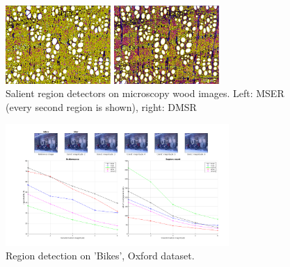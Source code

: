 \documentclass{article}
\begin{document}
\begin{figure}[htb]

\begin{minipage}[b]{.49\linewidth}
  \centering
  \centerline{\includegraphics[width=4.0cm]{./Figs/mserWood}}
\end{minipage}
\hfill
\begin{minipage}[b]{0.49\linewidth}
  \centering
  \centerline{\includegraphics[width=4.0cm]{./Figs/dmsrWood}}
\end{minipage}
\caption{Salient region detectors on microscopy wood images. Left: MSER (every second region is shown), right: DMSR}
\label{fig:wood}
%
\end{figure}
\begin{figure}[htb]
\centering
\begin{minipage}[b]{.99\linewidth}
  \centering
  \centerline{\includegraphics[width=8.5cm]{./Figs/repeatability_all_affine_bikes_blur}}
\end{minipage}
\hfill
\caption{Region detection on 'Bikes', Oxford dataset.}
\label{fig:det_bikes}
%
\end{figure}
\end{document}

